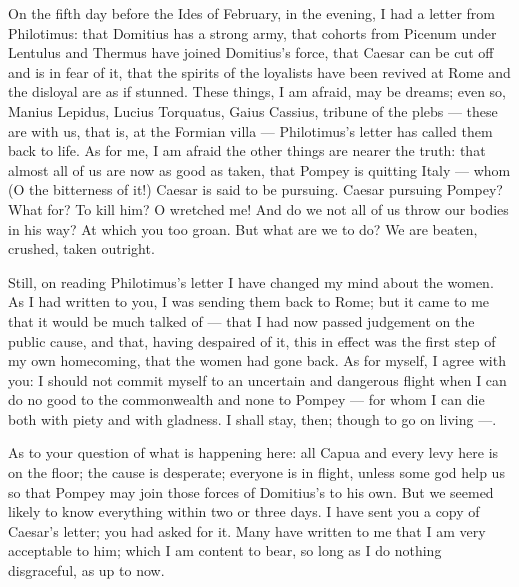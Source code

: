

 On the fifth day before the Ides of February, in the evening, I had a letter from Philotimus: that Domitius has a strong army, that cohorts from Picenum under Lentulus and Thermus have joined Domitius's force, that Caesar can be cut off and is in fear of it, that the spirits of the loyalists have been revived at Rome and the disloyal are as if stunned. These things, I am afraid, may be dreams; even so, Manius Lepidus, Lucius Torquatus, Gaius Cassius, tribune of the plebs --- these are with us, that is, at the Formian villa --- Philotimus's letter has called them back to life. As for me, I am afraid the other things are nearer the truth: that almost all of us are now as good as taken, that Pompey is quitting Italy --- whom (O the bitterness of it!) Caesar is said to be pursuing. Caesar pursuing Pompey? What for? To kill him? O wretched me! And do we not all of us throw our bodies in his way? At which you too groan. But what are we to do? We are beaten, crushed, taken outright.

 Still, on reading Philotimus's letter I have changed my mind about the women. As I had written to you, I was sending them back to Rome; but it came to me that it would be much talked of --- that I had now passed judgement on the public cause, and that, having despaired of it, this in effect was the first step of my own homecoming, that the women had gone back. As for myself, I agree with you: I should not commit myself to an uncertain and dangerous flight when I can do no good to the commonwealth and none to Pompey --- for whom I can die both with piety and with gladness. I shall stay, then; though to go on living ---.

 As to your question of what is happening here: all Capua and every levy here is on the floor; the cause is desperate; everyone is in flight, unless some god help us so that Pompey may join those forces of Domitius's to his own. But we seemed likely to know everything within two or three days. I have sent you a copy of Caesar's letter; you had asked for it. Many have written to me that I am very acceptable to him; which I am content to bear, so long as I do nothing disgraceful, as up to now.

